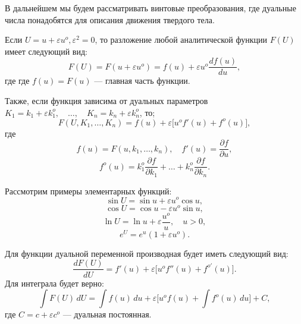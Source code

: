 В дальнейшем мы будем рассматривать винтовые преобразования, где дуальные числа понадобятся для описания движения твердого тела.

Если $U = u + \varepsilon u^o, \varepsilon^2 = 0$, то разложение любой аналитической функции $F(U)$ имеет следующий вид:
\begin{equation*}
    F(U) = F(u + \varepsilon u^o) = f(u) + \varepsilon u^o \frac{df(u)}{du},
\end{equation*}
где где $f(u) = F(u)$ --- главная часть функции.

Также, если функция зависима от дуальных параметров $K_1 = k_1 + \varepsilon k_1^o, \quad \dots, \quad K_n = k_n + \varepsilon k_n^o$, то;
\begin{equation*}
    F(U, K_1, \dots, K_n) = f(u) + \varepsilon \big[ u^o f'(u) + f^o(u) \big],
\end{equation*}
где 
\begin{equation*}
    f(u) = F(u, k_1, \dots, k_n), \quad f'(u) = \frac{\partial f}{\partial u},
\end{equation*}
\begin{equation*}
    f^o(u) = k_1^o \frac{\partial f}{\partial k_1} + \dots + k_n^o \frac{\partial f}{\partial k_n}.
\end{equation*}

Рассмотрим примеры элементарных функций:
\begin{equation*}
    \sin U = \sin u + \varepsilon u^o \cos u,
\end{equation*}
\begin{equation*}
    \cos U = \cos u - \varepsilon u^o \sin u,
\end{equation*}
\begin{equation*}
    \ln U = \ln u + \varepsilon \frac{u^o}{u}, \quad u > 0,
\end{equation*}
\begin{equation*}
    e^{U} = e^{u}(1 + \varepsilon u^o).
\end{equation*}

Для функции дуальной переменной производная будет иметь следующий вид:
\begin{equation*}
    \frac{dF(U)}{dU} = f'(u) + \varepsilon \big[ u^o f''(u) + f^{o'}(u) \big].
\end{equation*}
Для интеграла будет верно:
\begin{equation*}
    \int F(U) \, dU = \int f(u) \, du + \varepsilon \big[ u^o f(u) + \int f^o(u) \, du \big] + C,
\end{equation*}
где $C = c + \varepsilon c^o$ --- дуальная постоянная.

